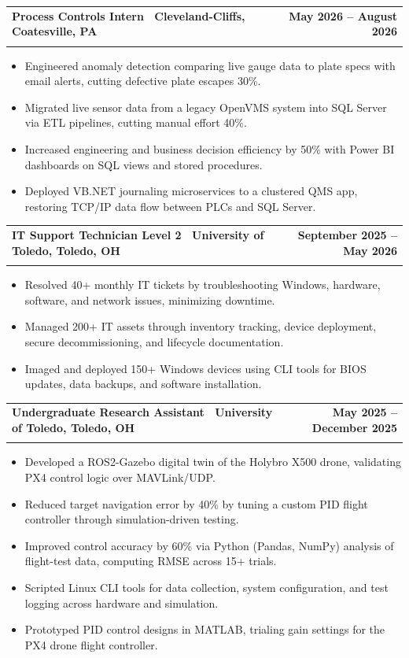 \documentclass[letterpaper,11pt]{article}
\makeatletter
\newcommand{\resumeItem}[1]{\item\small{#1 \vspace{-4pt}}}
\newcommand{\resumeSubheading}[4]{
    \vspace{-2pt}\item
    \begin{tabular*}{1.0\textwidth}[t]{l@{\extracolsep{\fill}}r}
        \textbf{#1} & \textbf{\small #2} \\
        \textit{\small#3} & \textit{\small #4}
    \end{tabular*}\vspace{-7pt}
}
\newcommand{\resumeItemListStart}{\begin{itemize}}
\newcommand{\resumeItemListEnd}{\end{itemize}\vspace{-7pt}}
\makeatother
\begin{document}
\resumeSubheading
{\textbf{Process Controls Intern} \textnormal{\textbar\ Cleveland-Cliffs, Coatesville, PA}}{May 2026 -- August 2026}
{}{}
\vspace{-0.6cm}
\resumeItemListStart

\resumeItem{Engineered anomaly detection comparing live gauge data to plate specs with email alerts, cutting defective plate escapes 30\%.}
\vspace{0.15cm}
\resumeItem{Migrated live sensor data from a legacy OpenVMS system into SQL Server via ETL pipelines, cutting manual effort 40\%.}
\vspace{0.15cm}
\resumeItem{Increased engineering and business decision efficiency by 50\% with Power BI dashboards on SQL views and stored procedures.}
\vspace{0.15cm}
\resumeItem{Deployed VB.NET journaling microservices to a clustered QMS app, restoring TCP/IP data flow between PLCs and SQL Server.}
\vspace{0.15cm}
\resumeItemListEnd
\resumeSubheading
{\textbf{IT Support Technician Level 2} \textnormal{\textbar\ University of Toledo, Toledo, OH}}{September 2025 -- May 2026}
{}{}
\vspace{-0.6cm}
\resumeItemListStart

\resumeItem{Resolved 40+ monthly IT tickets by troubleshooting Windows, hardware, software, and network issues, minimizing downtime.}
\vspace{0.15cm}
\resumeItem{Managed 200+ IT assets through inventory tracking, device deployment, secure decommissioning, and lifecycle documentation.}
\vspace{0.15cm}
\resumeItem{Imaged and deployed 150+ Windows devices using CLI tools for BIOS updates, data backups, and software installation.}
\vspace{0.15cm}

\resumeItemListEnd

\resumeSubheading
{\textbf{Undergraduate Research Assistant} \textnormal{\textbar\ University of Toledo, Toledo, OH}}{May 2025 -- December 2025}
{}{}
\vspace{-0.6cm}
\resumeItemListStart
\resumeItem{Developed a ROS2-Gazebo digital twin of the Holybro X500 drone, validating PX4 control logic over MAVLink/UDP.}
\vspace{0.15cm}
\resumeItem{Reduced target navigation error by 40\% by tuning a custom PID flight controller through simulation-driven testing.}
\vspace{0.15cm}
\resumeItem{Improved control accuracy by 60\% via Python (Pandas, NumPy) analysis of flight-test data, computing RMSE across 15+ trials.}
\vspace{0.15cm}
\resumeItem{Scripted Linux CLI tools for data collection, system configuration, and test logging across hardware and simulation.}
\vspace{0.15cm}
\resumeItem{Prototyped PID control designs in MATLAB, trialing gain settings for the PX4 drone flight controller.}
\resumeItemListEnd
\end{document}
